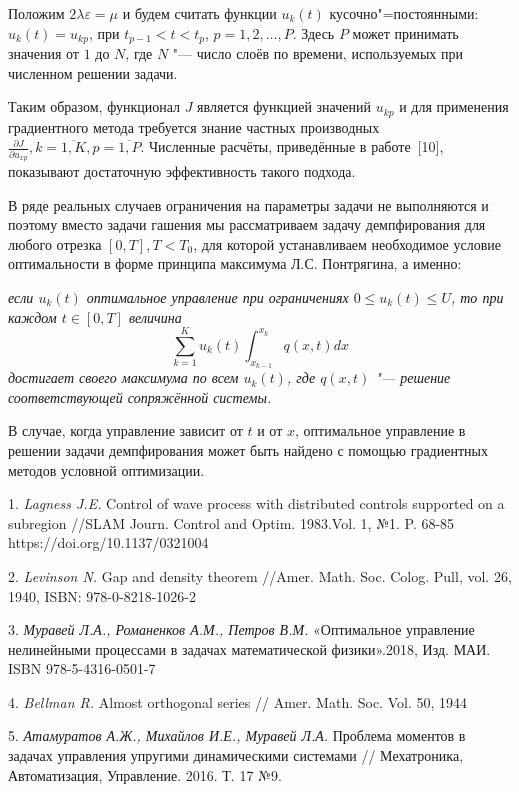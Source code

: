 Положим $2\lambda\varepsilon=\mu$ и будем считать функции $u_k(t)$ кусочно"=постоянными: $u_k(t)=u_{kp}$, при $t_{p-1}<t<t_p$, $p=1,2,\dots,P$. Здесь $P$ может принимать значения от $1$ до $N$, где $N$ "--- число слоёв по времени, используемых при численном решении задачи.

Таким образом, функционал $J$ является функцией значений $u_{kp}$ и для применения градиентного метода требуется знание частных производных $\frac{\partial J}{\partial u_{xp}}, k=\overline{1,K}, p=\overline{1,P}.$ Численные расчёты, приведённые в работе~[10], показывают достаточную эффективность такого подхода.

В ряде реальных случаев ограничения на параметры задачи не выполняются и поэтому вместо задачи гашения мы рассматриваем задачу демпфирования для любого отрезка $[0,T], T<T_0$, для которой устанавливаем необходимое условие оптимальности в форме принципа максимума Л.С. Понтрягина, а именно:

 {\it если $u_k(t)$ оптимальное управление при ограничениях
	$0\leq u_k(t)\leq U$, то при каждом $t\in[0,T]$ величина
	$$\sum_{k=1}^{K}u_k(t)\int_{x_{k-1}}^{x_k}q\left(x,t\right)dx$$
	достигает своего максимума по всем $u_k(t)$, где $q(x,t)$ "--- решение соответствующей сопряжённой системы.
}

В случае, когда управление зависит от $t$ и от $x$, оптимальное управление в решении задачи демпфирования может быть найдено с помощью градиентных методов условной оптимизации.

\litlist


1. {\it Lagness J.E.} Control of wave process with distributed controls supported on a subregion //SLAM Journ. Control and Optim. 1983.Vol. 1, №1. P. 68-85 https://doi.org/10.1137/0321004

2. {\it Levinson N.} Gap and density theorem //Amer. Math. Soc. Colog. Pull, vol. 26, 1940, ISBN: 978-0-8218-1026-2


3. {\it Муравей Л.А., Романенков А.М., Петров В.М.} «Оптимальное управление нелинейными процессами в задачах математической физики».2018, Изд. МАИ. ISBN 978-5-4316-0501-7


4. {\it Bellman R.} Almost orthogonal series // Amer. Math. Soc. Vol. 50, 1944


5.  {\it Атамуратов А.Ж., Михайлов И.Е., Муравей Л.А.} Проблема моментов в задачах управления упругими динамическими системами // Мехатроника, Автоматизация, Управление. 2016. Т. 17 №9.

